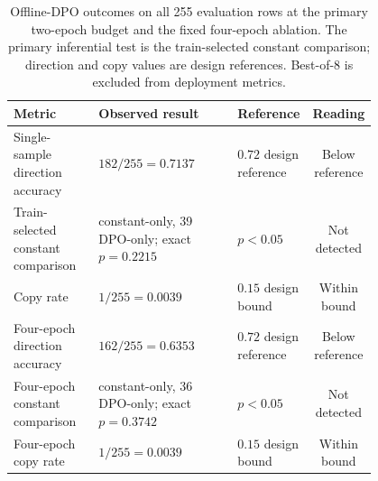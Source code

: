 \documentclass[11pt]{article}
\begin{document}
\begin{table}[!h]
\centering
\caption{Offline-DPO outcomes on all 255 evaluation rows at the primary two-epoch budget and the fixed four-epoch ablation. The primary inferential test is the train-selected constant comparison; direction and copy values are design references. Best-of-8 is excluded from deployment metrics.}
\label{tab:dpo_criteria}
\footnotesize
\setlength{\tabcolsep}{4pt}
\begin{tabular}{@{}>{\raggedright\arraybackslash}p{0.24\linewidth}>{\raggedright\arraybackslash}p{0.40\linewidth}>{\raggedright\arraybackslash}p{0.16\linewidth}c@{}}
\toprule
Metric & Observed result & Reference & Reading \\
\midrule
Single-sample direction accuracy & $182/255=0.7137$ & $0.72$ design reference & Below reference \\
Train-selected constant comparison & 28 constant-only, 39 DPO-only; exact $p=0.2215$ & $p<0.05$ & Not detected \\
Copy rate & $1/255=0.0039$ & $0.15$ design bound & Within bound \\
\midrule
Four-epoch direction accuracy & $162/255=0.6353$ & $0.72$ design reference & Below reference \\
Four-epoch constant comparison & 45 constant-only, 36 DPO-only; exact $p=0.3742$ & $p<0.05$ & Not detected \\
Four-epoch copy rate & $1/255=0.0039$ & $0.15$ design bound & Within bound \\
\bottomrule
\end{tabular}
\end{table}
\end{document}
